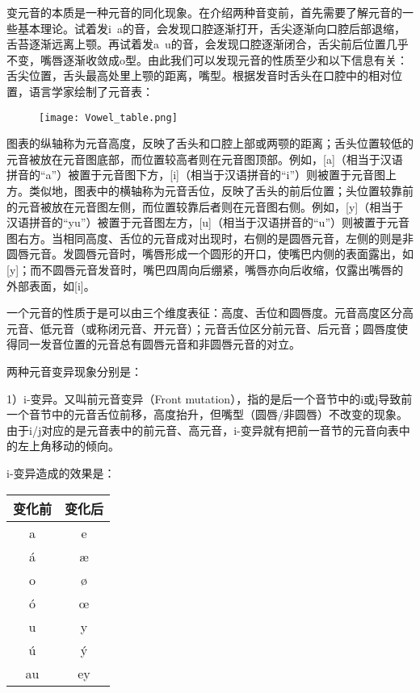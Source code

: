 变元音的本质是一种元音的同化现象。在介绍两种音变前，首先需要了解元音的一些基本理论。试着发i~a的音，会发现口腔逐渐打开，舌尖逐渐向口腔后部退缩，舌苔逐渐远离上颚。再试着发a~u的音，会发现口腔逐渐闭合，舌尖前后位置几乎不变，嘴唇逐渐收敛成o型。由此我们可以发现元音的性质至少和以下信息有关：舌尖位置，舌头最高处里上颚的距离，嘴型。根据发音时舌头在口腔中的相对位置，语言学家绘制了元音表：

\begin{figure}[H]
    \centering
    \texttt{[image: Vowel\_table.png]}
\end{figure}

图表的纵轴称为元音高度，反映了舌头和口腔上部或两颚的距离；舌头位置较低的元音被放在元音图底部，而位置较高者则在元音图顶部。例如，{[}a{]}（相当于汉语拼音的``a''）被置于元音图下方，{[}i{]}（相当于汉语拼音的``i''）则被置于元音图上方。类似地，图表中的横轴称为元音舌位，反映了舌头的前后位置；头位置较靠前的元音被放在元音图左侧，而位置较靠后者则在元音图右侧。例如，{[}y{]}（相当于汉语拼音的``yu''）被置于元音图左方，{[}u{]}（相当于汉语拼音的``u''）则被置于元音图右方。当相同高度、舌位的元音成对出现时，右侧的是圆唇元音，左侧的则是非圆唇元音。发圆唇元音时，嘴唇形成一个圆形的开口，使嘴巴内侧的表面露出，如{[}y{]}；而不圆唇元音发音时，嘴巴四周向后绷紧，嘴唇亦向后收缩，仅露出嘴唇的外部表面，如{[}i{]}。

一个元音的性质于是可以由三个维度表征：高度、舌位和圆唇度。元音高度区分高元音、低元音（或称闭元音、开元音）；元音舌位区分前元音、后元音；圆唇度使得同一发音位置的元音总有圆唇元音和非圆唇元音的对立。

两种元音变异现象分别是：

1）i-变异。又叫前元音变异（Front mutation），指的是后一个音节中的i或j导致前一个音节中的元音舌位前移，高度抬升，但嘴型（圆唇/非圆唇）不改变的现象。由于i/j对应的是元音表中的前元音、高元音，i-变异就有把前一音节的元音向表中的左上角移动的倾向。

i-变异造成的效果是：
\begin{table}[H]
    \centering
    \begin{tabular}{cc}
    \hline
    \textbf{变化前} & \textbf{变化后} \\ \hline
    a   & e   \\
    á   & æ   \\
    o   & ø   \\
    ó   & œ   \\
    u   & y   \\
    ú   & ý   \\
    au  & ey  \\ \hline
    \end{tabular}
\end{table}

